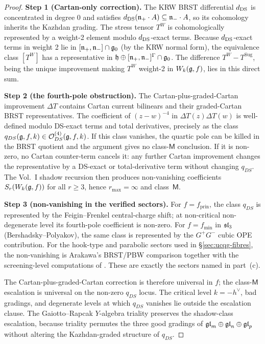 \begin{proof}
\textbf{Step 1 (Cartan-only correction).} The KRW BRST differential
$d_{\mathrm{DS}}$ is concentrated in degree 0 and satisfies
$d_{\mathrm{DS}}(\mathfrak{n}_{+}\cdot A) \subseteq \mathfrak{n}_{-}\cdot A$, so its cohomology
inherits the Kazhdan grading. The stress tensor $T^{W}$ is
cohomologically represented by a weight-2 element modulo
$d_{\mathrm{DS}}$-exact terms. Because $d_{\mathrm{DS}}$-exact terms in weight 2 lie
in $[\mathfrak{n}_{+}, \mathfrak{n}_{-}]\cap \mathfrak{g}_0$ (by the KRW normal form), the
equivalence class $[T^{W}]$ has a representative in $\mathfrak{h}\oplus
[\mathfrak{n}_{+}, \mathfrak{n}_{-}]^{\Gamma}\cap\mathfrak{g}_0$. The difference
$T^{W} - T^{\mathrm{Sug}}$, being the unique improvement making
$T^{W}$ weight-2 in $W_k(\mathfrak{g}, f)$, lies in this direct sum.

\textbf{Step 2 (the fourth-pole obstruction).} The
Cartan-plus-graded-Cartan improvement $\Delta T$ contains Cartan
current bilinears and their graded-Cartan BRST representatives. The
coefficient of $(z-w)^{-4}$ in $\Delta T(z)\Delta T(w)$ is well-defined
modulo DS-exact terms and total derivatives, precisely as the class
$q_{DS}(\mathfrak{g},f,k)\in\mathcal O^{(4)}_{DS}(\mathfrak{g},f,k)$. If this class
vanishes, the quartic pole can be killed in the BRST quotient and the
argument gives no class-$\mathsf M$ conclusion. If it is non-zero, no
Cartan counter-term cancels it: any further Cartan improvement changes
the representative by a DS-exact or total-derivative term without
changing $q_{DS}$. The Vol.~I shadow recursion then produces
non-vanishing coefficients $S_r(W_k(\mathfrak{g}, f))$ for all $r\ge 3$, hence
$r_{\max}=\infty$ and class~$\mathsf M$.

\textbf{Step 3 (non-vanishing in the verified sectors).} For
$f=f_{\mathrm{prin}}$, the class $q_{DS}$ is represented by the
Feigin--Frenkel central-charge shift; at non-critical non-degenerate
level its fourth-pole coefficient is non-zero. For
$f=f_{\mathrm{min}}$ in $\mathfrak{sl}_3$ (Bershadsky--Polyakov), the same
class is represented by the $G^+G^-$ cubic OPE contribution. For the
hook-type and parabolic sectors used in \S\ref{sec:ucqg-fibres}, the
non-vanishing is Arakawa's BRST/PBW comparison together with the
screening-level computations of \cite{Ara07}. These are exactly
the sectors named in part~(c).

The Cartan-plus-graded-Cartan correction is therefore universal in
$f$; the class-$\mathsf M$ escalation is universal on the non-zero
$q_{DS}$ locus. The critical level $k=-h^{\vee}$, bad gradings, and
degenerate levels at which $q_{DS}$ vanishes lie outside the
escalation clause. The Gaiotto--Rapcak $Y$-algebra triality preserves
the shadow-class escalation, because triality permutes the three good
gradings of $\mathfrak{gl}_m\oplus \mathfrak{gl}_n\oplus \mathfrak{gl}_p$ without altering the
Kazhdan-graded structure of $q_{DS}$.
\end{proof}

